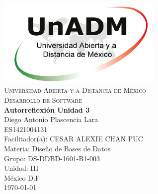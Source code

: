 \documentclass[spanish,12pt,letterpapper]{article}
\begin{document}
	\begin{titlepage}
		\begin{center}
			\includegraphics[width=0.6\textwidth]{../logoUnADM}~\\[1cm] 
			\textsc{Universidad Abierta y a Distancia de México}\\[0.8cm]
			\textsc{Desarrollo de Software}\\[1.8cm]
			
			\textbf{ \Large Autorreflexión Unidad 3}\\[3cm]
			
			Diego Antonio Plascencia Lara\\ ES1421004131 \\[0.4cm]
			Facilitador(a): CESAR ALEXIE CHAN PUC  \\
			Materia: Diseño de Bases de Datos\\
			Grupo: DS-DDBD-1601-B1-003 \\
			Unidad: III \\
			
			\vfill México D.F\\{\today}
			
		\end{center}
	\end{titlepage}
	
\end{document}
